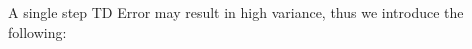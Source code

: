 \documentclass[preview]{standalone}
\begin{document}
\begin{center}
A single step TD Error may result in high variance, thus we introduce the following:
\end{center}
\end{document}
